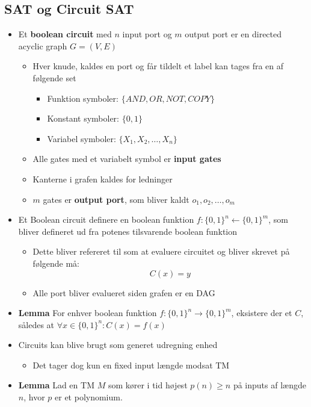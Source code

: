 \subsection{SAT og Circuit SAT}
\begin{itemize}
	\item Et \textbf{boolean circuit} med $n$ input port og $m$ output port er en directed acyclic graph $G=(V,E)$ 
  \begin{itemize}
  	\item Hver knude, kaldes en port og får tildelt et label kan tages fra en af følgende set
    \begin{itemize}
    	\item Funktion symboler: $\{AND, OR, NOT, COPY\}$
		  \item Konstant symboler: $\{0,1\}$
		  \item Variabel symboler: $\{X_1, X_2, \dots, X_n\}$
    \end{itemize}
    \item Alle gates med et variabelt symbol er \textbf{input gates}
    \item Kanterne i grafen kaldes for ledninger
    \item $m$ gates er \textbf{output port}, som bliver kaldt $o_1, o_2, \dots, o_m$
  \end{itemize}
  \item Et Boolean circuit definere en boolean funktion $f:\{0,1\}^n \leftarrow \{0,1\}^m$, som bliver defineret ud fra potenes tilsvarende boolean funktion
  \begin{itemize}
  	\item Dette bliver refereret til som at evaluere circuitet og bliver skrevet på følgende må:
    \begin{equation*}
      C(x) = y
    \end{equation*}
    \item Alle port bliver evalueret siden grafen er en DAG
  \end{itemize}
  \item \textbf{Lemma} For enhver boolean funktion $f: \{0,1\}^n \rightarrow \{0,1\}^m$, eksistere der et $C$, således at $\forall x \in \{0,1\}^n : C(x) = f(x)$
  \item Circuits kan blive brugt som generet udregning enhed
  \begin{itemize}
  	\item Det tager dog kun en fixed input længde modsat TM 
  \end{itemize}
  \item \textbf{Lemma} Lad en TM $M$ som kører i tid højest $p(n) \geq n$ på inputs af længde $n$, hvor $p$ er et polynomium. \smallskip


\end{itemize}
